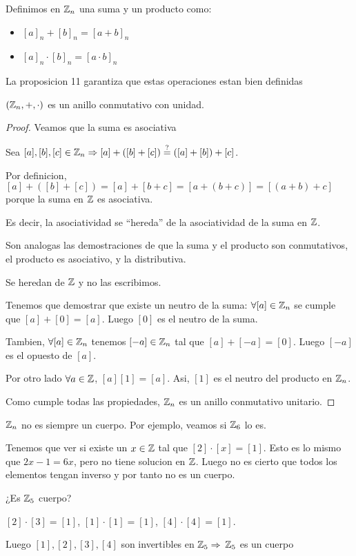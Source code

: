 \begin{definition}
	Definimos en \(\mathbb{Z}_n \) una suma y un producto como:
	\begin{itemize}
		\item \([a]_n + [b]_n = [a+b]_n\)
		\item \([a]_n \cdot [b]_n = [a \cdot b]_n \)
	\end{itemize}
	La proposicion 11 garantiza que estas operaciones estan bien definidas
\end{definition}
\begin{proposition}
	\((\mathbb{Z}_n, +, \cdot) \) es un anillo conmutativo con unidad.
\end{proposition}
\begin{proof}
	Veamos que la suma es asociativa
	
	Sea \([a], [b], [c] \in \mathbb{Z}_n \Rightarrow [a] + ([b] + [c]) \overset{?}{=} ([a] + [b]) + [c]\).
	
	Por definicion, \([a] + ([b] + [c]) = [a] + [b + c] = [a + (b + c )] = [(a+b) + c ]\) porque la suma en \(\mathbb{Z} \) es asociativa.
	
	Es decir, la asociatividad se ``hereda'' de la asociatividad de la suma en \(\mathbb{Z} \).
	
	Son analogas las demostraciones de que la suma y el producto son conmutativos, el producto es asociativo, y la distributiva.
	
	Se heredan de \(\mathbb{Z} \) y no las escribimos.
	
	Tenemos que demostrar que existe un neutro de la suma: \(\forall  [a] \in \mathbb{Z}_n \) se cumple que \([a] + [0] = [a ]\). Luego \([0 ]\) es el neutro de la suma.
	
	Tambien, \(\forall [a] \in \mathbb{Z}_n \) tenemos \([-a] \in \mathbb{Z}_n \) tal que \([a] + [-a] = [0 ]\). Luego \([-a ]\) es el opuesto de \([a ]\).
	
	Por otro lado \(\forall  a \in \mathbb{Z} \), \([a][1] = [a ]\). Asi,  \([1 ]\) es el neutro del producto en \(\mathbb{Z}_n \).
	
	Como cumple todas las propiedades, \(\mathbb{Z}_n \) es un anillo conmutativo unitario.
\end{proof}

\begin{example}
	\(\mathbb{Z}_n \) no es siempre un cuerpo. Por ejemplo, veamos si \(\mathbb{Z}_6 \) lo es.
	
	Tenemos que ver si existe un \(x \in  \mathbb{Z} \) tal que \([2] \cdot [x] = [1 ]\). Esto es lo mismo que \(2x - 1 = 6x \), pero no tiene solucion en \(\mathbb{Z} \). Luego no es cierto que todos los elementos tengan inverso y por tanto no es un cuerpo.
	
	¿Es \(\mathbb{Z}_5 \) cuerpo?
	
	\([2] \cdot [3] = [1]\), \([1] \cdot [1] = [1]\), \([4] \cdot [4] = [1]\).
	
	Luego \([1], [2], [3], [4]\) son invertibles en \(\mathbb{Z}_5 \Rightarrow\) \(\mathbb{Z}_5 \) es un cuerpo
\end{example}

